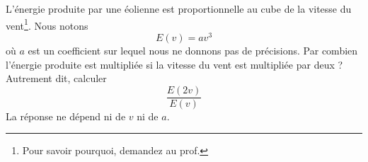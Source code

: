 
\begin{exercice}\label{exoSeconde-0068}

    L'énergie produite par une éolienne est proportionnelle au cube de la vitesse du vent\footnote{Pour savoir pourquoi, demandez au prof.}. Nous notons
    \begin{equation}
        E(v)=av^3
    \end{equation}
    où \( a\) est un coefficient sur lequel nous ne donnons pas de précisions. Par combien l'énergie produite est multipliée si la vitesse du vent est multipliée par deux ? Autrement dit, calculer
    \begin{equation}
        \frac{ E(2v) }{ E(v) }
    \end{equation}
    La réponse ne dépend ni de \( v\) ni de \( a\).

\end{exercice}
